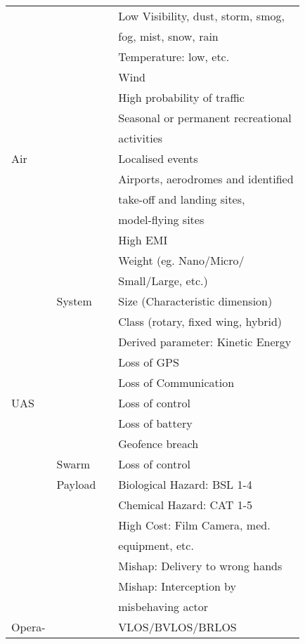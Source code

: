 \documentclass{ua_wgs_base}
\begin{document}
\begin{centering}
\begin{longtable}{|l|l|l|l|}
  & & & Low Visibility, dust, storm, smog, \\\cline{4-4}
  & & & fog, mist, snow, rain \\\cline{4-4}
  & & & Temperature: low, etc. \\\cline{4-4}
  & & & Wind \\\cline{1-4}
 \multirow{7}{3em}{Air} & & & High probability of traffic \\\cline{4-4}
  & & & Seasonal or permanent recreational \\
  & & & activities \\\cline{4-4}
  & & & Localised events \\\cline{4-4}
  & & & Airports, aerodromes and identified  \\
  & & & take-off and landing sites,  \\
  & & & model-flying sites \\\cline{4-4}
  & & & High EMI \\\cline{1-4}
  \multirow{15}{3em}{UAS} & \multirow{5}{7em}{System} & & Weight (eg. Nano/Micro/\\
  & & & Small/Large, etc.) \\\cline{4-4}
   & & & Size (Characteristic dimension) \\\cline{4-4}
   & & & Class (rotary, fixed wing, hybrid) \\\cline{4-4}
   & & & Derived parameter: Kinetic Energy \\\cline{4-4}
   & & & Loss of GPS \\\cline{4-4}
   & & & Loss of Communication \\\cline{4-4}
   & & & Loss of control \\\cline{4-4}
   & & & Loss of battery \\\cline{4-4}
   & & & Geofence breach \\\cline{2-4}
   & Swarm & & Loss of control \\\cline{2-4}
   & Payload & & Biological Hazard: BSL 1-4 \\\cline{4-4}
   & & & Chemical Hazard: CAT 1-5 \\\cline{4-4}
   & & & High Cost: Film Camera, med. \\
   & & & equipment, etc. \\\cline{4-4}
   & & & Mishap: Delivery to wrong hands \\\cline{4-4}
   & & & Mishap: Interception by \\
   & & & misbehaving actor  \\\cline{1-4}
   Opera- & & & VLOS/BVLOS/BRLOS \\\cline{4-4}

\end{longtable}
\end{centering}
\end{document}
